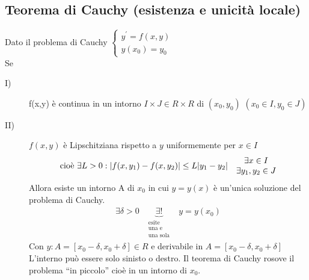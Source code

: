 \subsection{Teorema di Cauchy (esistenza e unicità locale)\label{tcauchy}}
\begin{defi}
  Dato il problema di Cauchy $\begin{cases}y^\prime=f(x,y)\\ y(x_0)=y_0\end{cases}$\\
  Se
  \begin{description}
  \item[I)] f(x,y) è continua in un intorno $I\times J \in R\times R$ di $(x_0,y_0)$
    $(x_0\in I, y_0\in J)$\clearpage
  \item[II)] $f(x,y)$ è Lipschitziana rispetto a $y$ uniformemente per $x \in I$
    \begin{eqnarray*}
      \text{cioè } & \exists L>0:\lvert f(x,y_1)-f(x,y_2)\rvert\leq L\lvert y_1-y_2\rvert
      & \begin{matrix}
          \exists x\in I\\
          \exists y_1, y_2\in J
        \end{matrix}
    \end{eqnarray*}
    Allora esiste un intorno A di $x_0$ in cui $y=y(x)$ è un'unica soluzione del problema
    di Cauchy.
    \begin{eqnarray*}
      \exists \delta >0 & \underbrace{\exists !}_{\begin{matrix} \text{esite} \\
                                                    \text{una e}\\
                                                    \text{una sola} \end{matrix}}
      & y=y(x_0)
    \end{eqnarray*}
    Con $y: A= [x_0-\delta,x_0+\delta]\in R$ e derivabile in
    $A= [x_0-\delta,x_0+\delta]$\\
    L'interno può essere solo sinisto o destro. Il teorema di Cauchy rosove il problema
    ``in piccolo'' cioè in un intorno di $x_0$. 
  \end{description}  
\end{defi}
